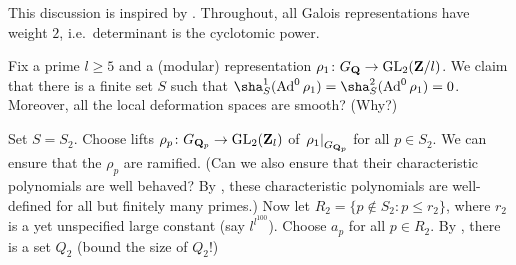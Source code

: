 This discussion is inspired by \cite{pande-2011}. Throughout, all Galois 
representations have weight $2$, i.e.~determinant is the cyclotomic power. 

Fix a prime $l\geqslant 5$ and a (modular) representation 
$\rho_1\colon G_{\mathbf{Q}} \to \operatorname{GL}_2(\mathbf{Z}/l)$. We claim that there is a finite set 
$S$ such that $\sha_S^1(\Ad^0\rho_1) = \sha_S^2(\Ad^0 \rho_1) = 0$. Moreover, 
all the local deformation spaces are smooth? (Why?)

Set $S=S_2$. Choose lifts $\rho_p\colon G_{\mathbf{Q}_p} \to \operatorname{GL}_2(\mathbf{Z}_l)$ of 
$\left.\rho_1\right|_{G_{\mathbf{Q}_p}}$ for all $p\in S_2$. We can ensure that the 
$\rho_p$ are ramified. (Can we also ensure that their characteristic 
polynomials are well behaved? By \cite{khare-rajan-2001}, these 
characteristic polynomials are well-defined for all but finitely many primes.)
Now let $R_2 = \{p\notin S_2 : p\leqslant r_2\}$, where $r_2$ is a yet 
unspecified large constant (say $l^{l^{100}}$). Choose $a_p$ for all 
$p\in R_2$. By \cite[Lem.~5.1]{pande-2011}, there is a set $Q_2$ (bound the 
size of $Q_2$!) 
